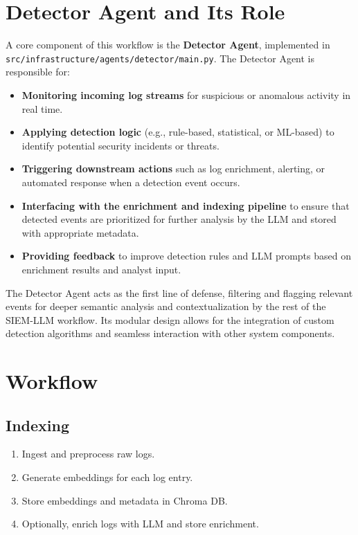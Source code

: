 \documentclass{article}
\begin{document}
\section{Detector Agent and Its Role}
A core component of this workflow is the \textbf{Detector Agent}, implemented in \texttt{src/infrastructure/agents/detector/main.py}. The Detector Agent is responsible for:
\begin{itemize}
    \item \textbf{Monitoring incoming log streams} for suspicious or anomalous activity in real time.
    \item \textbf{Applying detection logic} (e.g., rule-based, statistical, or ML-based) to identify potential security incidents or threats.
    \item \textbf{Triggering downstream actions} such as log enrichment, alerting, or automated response when a detection event occurs.
    \item \textbf{Interfacing with the enrichment and indexing pipeline} to ensure that detected events are prioritized for further analysis by the LLM and stored with appropriate metadata.
    \item \textbf{Providing feedback} to improve detection rules and LLM prompts based on enrichment results and analyst input.
\end{itemize}
The Detector Agent acts as the first line of defense, filtering and flagging relevant events for deeper semantic analysis and contextualization by the rest of the SIEM-LLM workflow. Its modular design allows for the integration of custom detection algorithms and seamless interaction with other system components.

\section{Workflow}
\subsection{Indexing}
\begin{enumerate}
    \item Ingest and preprocess raw logs.
    \item Generate embeddings for each log entry.
    \item Store embeddings and metadata in Chroma DB.
    \item Optionally, enrich logs with LLM and store enrichment.
\end{enumerate}
\end{document}
